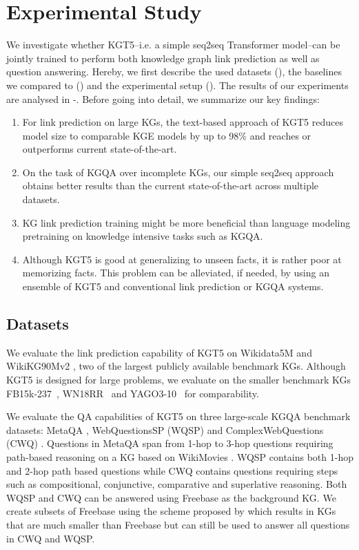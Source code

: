 \documentclass[11pt]{article}
\renewcommand\:{\colon} \newcommand{\sset}[1]{\left\{\,#1\,\right\}} \newcommand{\ssets}[1]{\left\{#1\right\}} \newcommand{\ssetn}[1]{\{\,#1\,\}}
\newcommand{\method}{\textsc{KGT5}}
\begin{document}
\section{Experimental Study}
\label{sec:experimental_study}
We investigate whether KGT5--i.e. a simple seq2seq Transformer model--can be jointly trained to perform both knowledge graph link prediction as well as question answering. Hereby, we first describe the used datasets (), the baselines we compared to () and the experimental setup (). The results of our experiments are analysed in -.
Before going into detail, we summarize our key findings:
\begin{enumerate}
    \item For link prediction on large KGs, the text-based approach of \method{} reduces model size to comparable KGE models by up to 98\% and reaches or outperforms current state-of-the-art. \item On the task of KGQA over incomplete KGs, our simple seq2seq approach obtains better results than the current state-of-the-art across multiple datasets.
    \item KG link prediction training might be more beneficial than language modeling pretraining on knowledge intensive tasks such as KGQA.
\item Although \method{} is good at generalizing to unseen facts, it is rather poor at memorizing facts.
This problem can be alleviated, if needed, by using an ensemble of \method{} and conventional link prediction or KGQA systems.


\end{enumerate}



\subsection{Datasets}
\label{sec:datasets}
We evaluate the link prediction capability of \method{} on Wikidata5M \cite{wang2021KEPLER} and WikiKG90Mv2 \cite{hu2021ogblsc}, two of the largest publicly available benchmark KGs. 
Although \method{} is designed for large problems, we evaluate on the smaller benchmark KGs FB15k-237~\cite{toutanova2015observed}, WN18RR~\cite{dettmers2018convolutional} and YAGO3-10~\cite{dettmers2018convolutional} for comparability.


We evaluate the QA capabilities of \method{} on three large-scale KGQA benchmark datasets: MetaQA \cite{zhang2017variational}, WebQuestionsSP (WQSP) \cite{yih-etal-2016-value} and ComplexWebQuestions (CWQ) \cite{Talmor2018TheWA}. Questions in MetaQA span from 1-hop to 3-hop questions requiring path-based reasoning on a KG based on WikiMovies \cite{miller2016keyvalue}. WQSP contains both 1-hop and 2-hop path based questions while CWQ contains questions requiring steps such as compositional, conjunctive, comparative and superlative reasoning. Both WQSP and CWQ can be answered using Freebase \cite{freebase:datadumps} as the background KG. 
We create subsets of Freebase using the scheme proposed by \citet{ren2021lego} which results in KGs that are much smaller than Freebase but can still be used to answer all questions in CWQ and WQSP.
\end{document}
